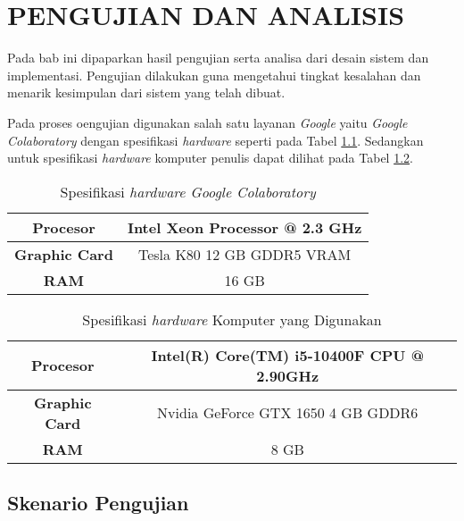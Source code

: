 \chapter{PENGUJIAN DAN ANALISIS}
\label{chap:pengujiananalisis}


Pada bab ini dipaparkan hasil pengujian serta analisa dari desain sistem dan implementasi. Pengujian dilakukan guna mengetahui tingkat kesalahan dan menarik kesimpulan dari sistem yang telah dibuat.

Pada proses oengujian digunakan salah satu layanan \textit{Google} yaitu \textit{Google Colaboratory} dengan spesifikasi \textit{hardware} seperti pada Tabel \ref{tab:spek-colab}. Sedangkan untuk spesifikasi \textit{hardware} komputer penulis dapat dilihat pada Tabel \ref{tab:spek-pc}.
\begin{table}[h!]
	\begin{center}
		\begin{tabular}{ |c|c| } 
			\hline
			\textbf{Procesor} & Intel Xeon Processor @ 2.3 GHz\\
			\hline 
			\textbf{Graphic Card} & Tesla K80 12 GB GDDR5 VRAM\\
			\hline 
			\textbf{RAM} & 16 GB\\ 
			\hline
		\end{tabular}
		\caption{Spesifikasi \textit{hardware Google Colaboratory}}
		\label{tab:spek-colab}
	\end{center}
\end{table} 

\begin{table}[h!]
	\begin{center}
		\begin{tabular}{ |c|c| } 
			\hline
			\textbf{Procesor} & Intel(R) Core(TM) i5-10400F CPU @ 2.90GHz\\
			\hline 
			\textbf{Graphic Card} & Nvidia GeForce GTX 1650 4 GB GDDR6\\
			\hline 
			\textbf{RAM} & 8 GB\\ 
			\hline
		\end{tabular}
		\caption{Spesifikasi \textit{hardware} Komputer yang Digunakan}
		\label{tab:spek-pc}
	\end{center}
\end{table}

\section{Skenario Pengujian}
\label{sec:skenariopengujian}

